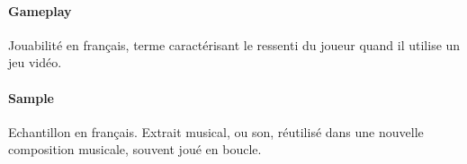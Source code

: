 \documentclass [a4 paper,11pt]{report}
\begin{document}
\paragraph{Gameplay} Jouabilité en français, terme caractérisant le ressenti du joueur quand il utilise un jeu vidéo.

\paragraph{Sample} Echantillon en français. Extrait musical, ou son, réutilisé dans une nouvelle composition musicale, souvent joué en boucle.

\paragraph{}



\newpage




\newpage



\newpage



\newpage



\newpage



\newpage


\end{document}
